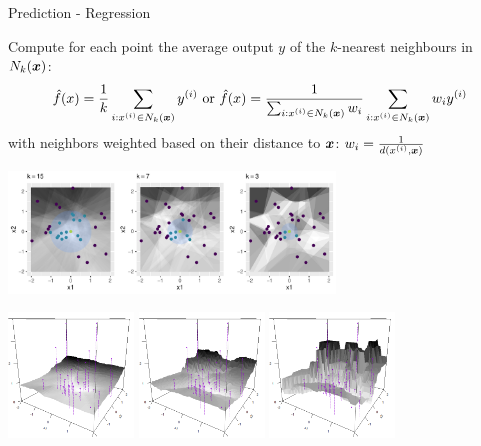 \documentclass[11pt,compress,t,notes=noshow, xcolor=table]{beamer}
\begin{document}
\begin{vbframe}{Prediction - Regression}
\begin{footnotesize}
Compute for each point the average output $y$ of the $k$-nearest neighbours in $N_k(\bm{x})$: 
$$
\hat{f}(x) = \frac{1}{k} \sum_{i: x^{(i)} \in N_k(\bm{x})} y^{(i)} \text  { or }  
\hat{f}(x) = \frac{1}{\sum_{i: x^{(i)} \in N_k(\bm{x})} w_i} \sum_{i: x^{(i)} \in N_k(\bm{x})} w_i y^{(i)}
$$
with neighbors weighted based on their distance to $\bm{x}$: $w_i = \frac{1}{d(x^{(i)}, \bm{x})}$
\vspace{-0.3cm}
\begin{center}
\includegraphics[width=0.65\textwidth,keepaspectratio]{figure/reg_knn_contour}

\vspace{-0.1cm}
\includegraphics[width=0.25\textwidth]{figure/knn-reg-3d-15.png} 
\includegraphics[width=0.25\textwidth]{figure/knn-reg-3d-7.png}
\includegraphics[width=0.25\textwidth]{figure/knn-reg-3d-3.png}
\end{center}

\end{footnotesize}

\end{vbframe}
\end{document}
